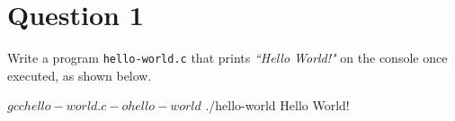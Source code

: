 
\section*{Question 1}

Write a program \texttt{hello-world.c} that prints \textit{``Hello World!"} on the console once executed, as shown below.

\begin{terminal}
$ gcc hello-world.c -o hello-world
$ ./hello-world
Hello World!
\end{terminal}
